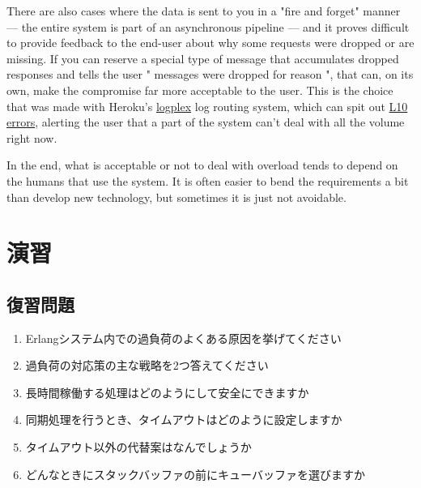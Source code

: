 There are also cases where the data is sent to you in a "fire and forget" manner — the entire system is part of an asynchronous pipeline — and it proves difficult to provide feedback to the end-user about why some requests were dropped or are missing. If you can reserve a special type of message that accumulates dropped responses and tells the user " messages were dropped for reason ", that can, on its own, make the compromise far more acceptable to the user. This is the choice that was made with Heroku's \href{https://devcenter.heroku.com/articles/logplex}{logplex} log routing system, which can spit out \href{https://devcenter.heroku.com/articles/error-codes\#l10-drain-buffer-overflow}{L10 errors}, alerting the user that a part of the system can't deal with all the volume right now.

In the end, what is acceptable or not to deal with overload tends to depend on the humans that use the system. It is often easier to bend the requirements a bit than develop new technology, but sometimes it is just not avoidable.


\section{演習}

\subsection*{復習問題}

\begin{enumerate}
  \item Erlangシステム内での過負荷のよくある原因を挙げてください
  \item 過負荷の対応策の主な戦略を2つ答えてください
  \item 長時間稼働する処理はどのようにして安全にできますか  
  \item 同期処理を行うとき、タイムアウトはどのように設定しますか  
  \item タイムアウト以外の代替案はなんでしょうか
  \item どんなときにスタックバッファの前にキューバッファを選びますか
\end{enumerate}

